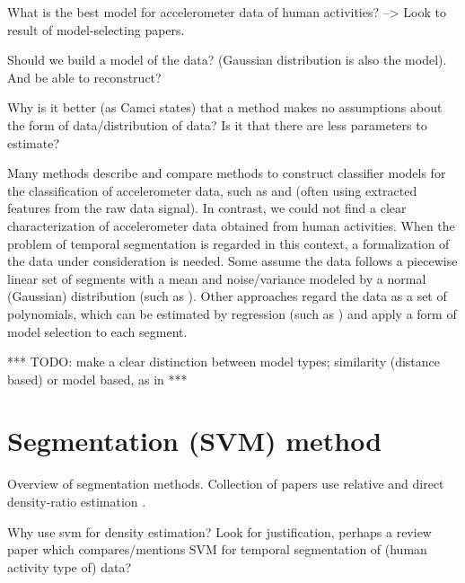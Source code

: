 What is the best model for accelerometer data of human activities? --> Look to result of model-selecting papers.

Should we build a model of the data? (Gaussian distribution is also the model). And be able to reconstruct?

Why is it better (as Camci states) that a method makes no assumptions about the form of data/distribution of data? Is it that there are less parameters to estimate?

Many methods describe and compare methods to construct classifier models for the classification of accelerometer data, such as \cite{kwapisz2011activity} and \cite{zhang2011optimal} (often using extracted features from the raw data signal).
In contrast, we could not find a clear characterization of accelerometer data obtained from human activities.
When the problem of temporal segmentation is regarded in this context, a formalization of the data under consideration is needed.
Some assume the data follows a piecewise linear set of segments with a mean and noise/variance modeled by a normal (Gaussian) distribution (such as \cite{camci2010change}).
Other approaches regard the data as a set of polynomials, which can be estimated by regression (such as \cite{chamroukhi2013joint}) and apply a form of model selection to each segment.

*** TODO: make a clear distinction between model types; similarity (distance based) or model based, as in \cite{yin2008sensor} ***

\section{Segmentation (SVM) method}
Overview of segmentation methods.
Collection of papers use relative and direct density-ratio estimation \cite{kawahara2009change, liu2013change}.

Why use \gls{svm} for density estimation? Look for justification, perhaps a review paper which compares/mentions SVM for temporal segmentation of (human activity type of) data?

